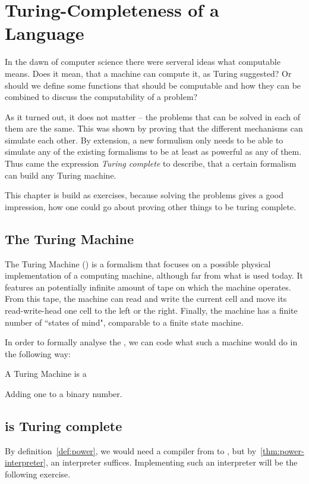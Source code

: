\section{Turing-Completeness of a Language}
\label{sec:Turing Completeness}
In the dawn of computer science there were serveral ideas what computable 
means. Does it mean, that a machine can compute it, as Turing suggested? Or 
should we define some functions that should be computable and how they can be
combined to discuss the computability of a problem?

As it turned out, it does not matter -- the problems that can be solved in 
each of them are the same. This was shown by proving that the different 
mechanisms can simulate each other. By extension, a new formulism only needs 
to be able to simulate any of the existing formalisms to be at least as 
powerful as any of them. Thus came the expression {\em Turing complete} to 
describe, that a certain formalism can build any Turing machine.

This chapter is build as exercises, because solving the problems gives a good 
impression, how one could go about proving other things to be turing complete.

\subsection{The Turing Machine}
The Turing Machine (\TM) is a formalism that focuses on a possible physical 
implementation of a computing machine, although far from what is used today. 
It features an potentially infinite amount of tape on which the machine 
operates. From this tape, the machine can read and write the current cell and 
move its read-write-head one cell to the left or the right. Finally, the 
machine has a finite number of ``states of mind", comparable to a finite 
state machine.

In order to formally analyse the \TM, we can code what such a machine would 
do in the following way:

\begin{defn}
	\label{def:tm}
	A Turing Machine is a \TODO
\end{defn}

\begin{example}
	Adding one to a binary number. \TODO
\end{example}

\subsection{\WHILE is Turing complete}
By definition~\ref{def:power}, we would need a compiler from \TM to \WHILE, 
but by~\ref{thm:power-interpreter}, an interpreter suffices. Implementing such an 
interpreter will be the following exercise.

